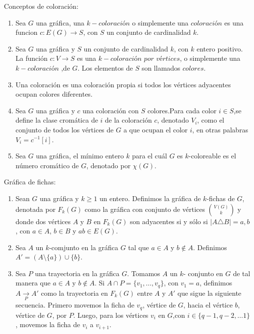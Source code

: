 \begin{definicion} Conceptos de coloraci\'on:
    \label{def:coloracion}
    \begin{enumerate}
        \item Sea $G$ una gr\'afica, una $k-\textit{coloraci\'on}$ o simplemente
        una $\textit{coloraci\'on}$ es una funcion $c: E(G)\rightarrow S$, con
        $S$ un conjunto de cardinalidad $k$.
        \item Sea $G$ una gr\'afica y $S$ un conjunto de cardinalidad $k$, con
        $k$ entero positivo. La funci\'on $c: V \rightarrow S$ es una
        $k-\textit{coloraci\'on por v\'ertices}$, o simplemente una
        $k-\textit{coloraci\'on}$ ,de $G$. Los elementos de $S$ son llamados
        $\textit{colores}$.
        \item Una coloraci\'on es una coloraci\'on propia si todos los
        v\'ertices adyacentes ocupan colores diferentes.
        \item Sea $G$ una gr\'afica y $c$ una coloraci\'on con $S$ colores.Para
        cada color $i \in S$,se define la clase crom\'atica de $i$ de la
        coloraci\'on $c$, denotado $V_i$, como el conjunto de todos los
        v\'ertices de $G$ a que ocupan el color $i$, en otras palabras $V_i =
        c^{-1}[i]$.
        \item  Sea $G$ una gr\'afica, el m\'inimo entero $k$ para el cu\'al $G$
        es $k$-coloreable es el n\'umero crom\'atico de $G$, denotado por
        $\chi(G)$.
    \end{enumerate}
\end{definicion}

\begin{definicion} Gr\'afica de fichas:
    \label{def:fichas}
    \begin{enumerate}
        \item Sean $G$ una gr\'afica y $k \geq 1$ un entero. Definimos la
        gr\'afica de $k$-fichas de $G$, denotada por $F_k(G)$ como la
        gr\'afica con conjunto de v\'ertices $\binom{V(G)}{k}$ y donde dos
        v\'ertices $A$ y $B$ en $F_k(G)$ son adyacentes si y s\'olo si $|A
        \triangle B| ={a,b}$, con $a \in A$, $b \in B$ y $ab \in E(G)$.
        \item Sea $A$ un $k$-comjunto en la gr\'afica $G$ tal que $a \in A$
        y $b\notin A$. Definimos $A'= (A \setminus \{a\}) \cup \{b\}$.
        \item Sea $P$ una trayectoria en la gr\'afica $G$. Tomamos $A$ un
        $k$- conjunto en $G$ de tal manera que $a\in A$ y $b \notin A$. Si
        $A\cap P =\{v_1, \dots, v_q\}$, con $v_1 = a$, definimos $A
        \xrightarrow[P]{} A'$ como la trayectoria en $F_k(G)$ entre $A$ y
        $A'$ que sigue la siguiente secuencia. Primero movemos la ficha de
        $v_q$, v\'ertice de $G$, hacia el v\'ertice $b$, v\'ertice de $G$,
        por $P$. Luego, para los v\'ertices $v_i$ en $G$,con $i \in \{q-1,
        q-2, \dots 1\}$, movemos la ficha de $v_i$ a $v_{i+1}$. 
    \end{enumerate}
\end{definicion}

